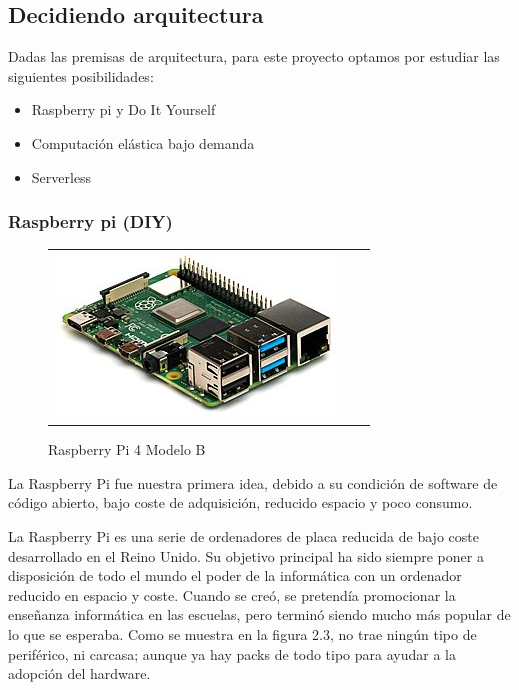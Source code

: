 \subsection{Decidiendo arquitectura}
Dadas las premisas de arquitectura, para este proyecto optamos por estudiar las siguientes posibilidades:
\begin{itemize}
    \item Raspberry pi y Do It Yourself
    \item Computación elástica bajo demanda
    \item Serverless
\end{itemize}
\subsubsection{Raspberry pi (DIY)}
\begin{figure}[h]
\centering
\begin{tabular}{ccc}
\includegraphics[scale=0.5]{archivos/RPi_4.jpg}
\end{tabular}
\caption{Raspberry Pi 4 Modelo B}
\label{fig:rpi4}
\end{figure}
\vspace{1em}
\par La Raspberry Pi fue nuestra primera idea, debido a su condición de software de código abierto, bajo coste de adquisición, reducido espacio y poco consumo.
\vspace{1em}
\par La Raspberry Pi es una serie de ordenadores de placa reducida de bajo coste desarrollado en el Reino Unido. Su objetivo principal ha sido siempre poner a disposición de todo el mundo el poder de la informática con un ordenador reducido en espacio y coste. Cuando se creó, se pretendía promocionar la enseñanza informática en las escuelas, pero terminó siendo mucho más popular de lo que se esperaba. Como se muestra en la figura 2.3, no trae ningún tipo de periférico, ni carcasa; aunque ya hay packs de todo tipo para ayudar a la adopción del hardware.
